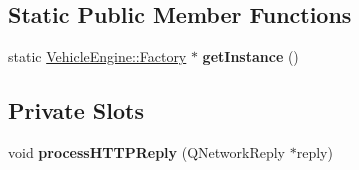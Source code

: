 \subsection*{Static Public Member Functions}
\begin{DoxyCompactItemize}
\item 
\mbox{\label{classVehicleEngine_1_1Factory_aac29410d8cbfa22f0f47f52dd2d8ab3d}} 
static \mbox{\hyperlink{classVehicleEngine_1_1Factory}{Vehicle\+Engine\+::\+Factory}} $\ast$ {\bfseries get\+Instance} ()
\end{DoxyCompactItemize}
\subsection*{Private Slots}
\begin{DoxyCompactItemize}
\item 
\mbox{\label{classVehicleEngine_1_1Factory_acd692b52ab3ccb817ea4a54d427d9226}} 
void {\bfseries process\+H\+T\+T\+P\+Reply} (Q\+Network\+Reply $\ast$reply)
\end{DoxyCompactItemize}
